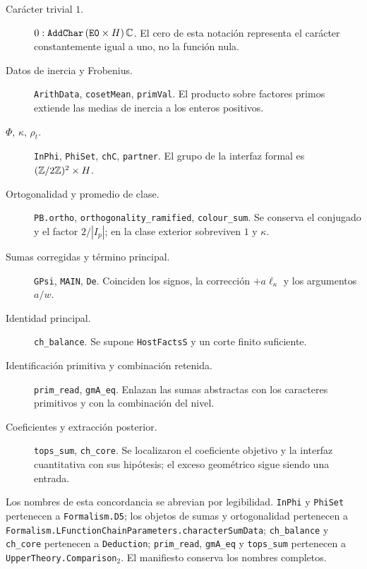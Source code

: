 \begingroup
\raggedright
\begin{description}
\item[Carácter trivial $1$.] $0:\texttt{AddChar}\,(\texttt{E0}\times H)\,\mathbb{C}$. El cero de esta notación representa el carácter constantemente igual a uno, no la función nula.

\item[Datos de inercia y Frobenius.] \texttt{ArithData}, \texttt{cosetMean}, \texttt{primVal}. El producto sobre factores primos extiende las medias de inercia a los enteros positivos.

\item[$\Phi$, $\kappa$, $\rho_t$.] \texttt{InPhi}, \texttt{PhiSet}, \texttt{chC}, \texttt{partner}. El grupo de la interfaz formal es $(\mathbb{Z}/2\mathbb{Z})^2\times H$.

\item[Ortogonalidad y promedio de clase.] \texttt{PB.ortho}, \texttt{orthogonality\_ramified}, \texttt{colour\_sum}. Se conserva el conjugado y el factor $2/|I_p|$; en la clase exterior sobreviven $1$ y $\kappa$.

\item[Sumas corregidas y término principal.] \texttt{GPsi}, \texttt{MAIN}, \texttt{De}. Coinciden los signos, la corrección $+a\ell_\kappa$ y los argumentos $a/w$.

\item[Identidad principal.] \texttt{ch\_balance}. Se supone \texttt{HostFactsS} y un corte finito suficiente.

\item[Identificación primitiva y combinación retenida.] \texttt{prim\_read}, \texttt{gmA\_eq}. Enlazan las sumas abstractas con los caracteres primitivos y con la combinación del nivel.

\item[Coeficientes y extracción posterior.] \texttt{tops\_sum}, \texttt{ch\_core}. Se localizaron el coeficiente objetivo y la interfaz cuantitativa con sus hipótesis; el exceso geométrico sigue siendo una entrada.

\end{description}
\par
\endgroup

Los nombres de esta concordancia se abrevian por legibilidad. \texttt{InPhi} y \texttt{PhiSet} pertenecen a \texttt{Formalism.D5}; los objetos de sumas y ortogonalidad pertenecen a \texttt{Formalism.LFunctionChainParameters.characterSumData}; \texttt{ch\_balance} y \texttt{ch\_core} pertenecen a \texttt{Deduction}; \texttt{prim\_read}, \texttt{gmA\_eq} y \texttt{tops\_sum} pertenecen a \texttt{UpperTheory.Comparison}$_2$. El manifiesto conserva los nombres completos.

